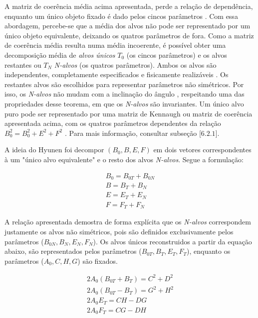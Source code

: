 \documentclass{article}
\begin{document}
A matriz de coerência média acima apresentada, perde a relação de dependência, enquanto um único objeto fixado é dado pelos cincos parâmetros \cite{jong:2009}. Com essa abordagem, percebe-se que a média dos alvos não pode ser representado por um único objeto equivalente, deixando os quatros parâmetros de fora. Como a matriz de coerência média resulta numa média incoerente, é possível obter uma decomposição média de \textit{alvos únicos}  $T_{0}$ (os cincos parâmetros) e os alvos restantes ou $T_{N}$ \textit{N-alvos} (os quatros parâmetros). Ambos os alvos são independentes, completamente especificados e fisicamente realizáveis \cite{jong:2009}. Os restantes alvos são escolhidos para representar parâmetros não simétricos. Por isso, os \textit{N-alvos} não mudam com a inclinação do ângulo \cite{jong:2009}, respeitando uma das propriedades desse teorema, em que os \textit{N-alvos} são invariantes. Um único alvo puro pode ser representado por uma matriz de Kennaugh ou matriz de coerência apresentada acima, com os quatros parâmetros dependentes da relação $B^2_{0}=B^2_{0}+E^2+F^2$ \cite{jong:2009}. Para mais informação, consultar \cite{jong:2009} subseção [$6.2.1$].

A ideia do Hyunen foi decompor $(B_{0}, B, E, F)$ em dois vetores correspondentes à um "único alvo equivalente" e o resto dos alvos \textit{N-alvos}. Segue a formulação:

\begin{equation}
    \begin{split}
            B_{0} = B_{0T} + B_{0N} \\ B = B_{T}+B_{N} \\
            E = E_{T} + E_{N} \\ F = F_{T}+F_{N}
    \end{split}
\end{equation}

A relação apresentada demostra de forma explícita que os \textit{N-alvos}  correspondem justamente os alvos não simétricos, pois são definidos exclusivamente pelos parâmetros ($B_{0N}, B_{N}, E_{N}, F_{N}$). Os alvos únicos reconstruidos a partir da equação abaixo, são representados pelos parâmetros ($B_{0T}, B_{T}, E_{T}, F_{T}$), enquanto os parâmetros ($A_{0} , C, H, G$) são fixados.

\begin{equation}
    \begin{split}
        2A_{0} (B_{0T} + B_{T} ) = C^2 + D^2 \\ 2A_{0} (B_{0T}-B_{T}) = G^2 + H^2\\
        2A_{0} E_{T} = CH-DG \\ 2A_{0} F_{T} = CG-DH
    \end{split}
\end{equation}
\end{document}

